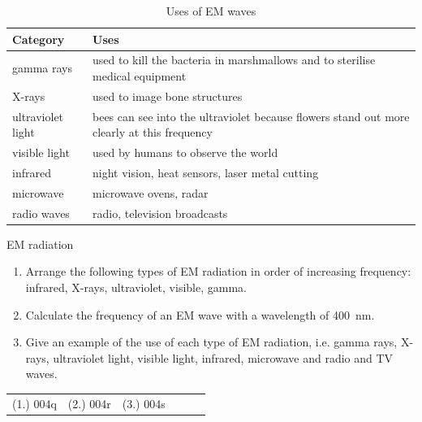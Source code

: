           \begin{table}[H]
        \begin{center}
      \label{m38778*uid9}
    \noindent
    
      \begin{tabular}{|l|p{7cm}|}\hline
                \textbf{Category}
               &
                \textbf{Uses}
              \\ \hline
        gamma rays &
        used to kill the bacteria in marshmallows and to sterilise medical equipment \\ \hline
        X-rays &
        used to image bone structures \\ \hline
        ultraviolet light &
        bees can see into the ultraviolet because flowers stand out more clearly at this frequency \\ \hline
        visible light &
        used by humans to observe the world \\ \hline
        infrared &
        night vision, heat sensors, laser metal cutting \\ \hline
        microwave &
        microwave ovens, radar \\ \hline
        radio waves &
        radio, television broadcasts \\ \hline
    \end{tabular}
      \end{center}\label{Table:EMUses}
        \caption{
	  Uses of EM waves
	}
\end{table}
\begin{exercises}{EM radiation}\noindent\vspace{-1cm}
            
      \label{m38778*id188768}\begin{enumerate}[noitemsep, label=\textbf{\arabic*}. ] 
            \label{m38778*uid10}\item Arrange the following types of EM radiation in order of increasing frequency: infrared, X-rays, ultraviolet, visible, gamma.\newline
\label{m38778*uid11}\item Calculate the frequency of an EM wave with a wavelength of 400~nm.\newline
\label{m38778*uid12}\item Give an example of the use of each type of EM radiation, i.e.\@{} gamma rays, X-rays, ultraviolet light, visible light, infrared, microwave and radio and TV waves.\newline
\end{enumerate}
    \label{m38778*cid6}
\par \practiceinfo
 \par \begin{tabular}[h]{cccccc}
 (1.) 004q  &  (2.) 004r  &  (3.) 004s  & \end{tabular}
\end{exercises}
